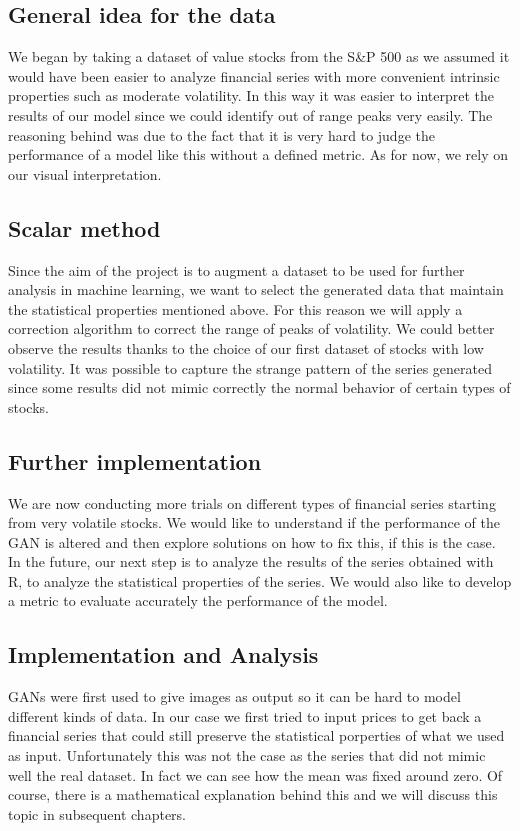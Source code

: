 \documentclass{article}
\begin{document}
\begin{multicols}{2}
    \subsection*{General idea for the data}
    We began by taking a dataset of value stocks from the S\&P 500 as we assumed it would have been easier to analyze financial series with more convenient intrinsic properties such as moderate volatility. In this way it was easier to interpret the results of our model since we could identify out of range peaks very easily. The reasoning behind was due to the fact that it is very hard to judge the performance of a model like this without a defined metric. As for now, we rely on our visual interpretation.\\ 
    
    \subsection*{Scalar method}
    Since the aim of the project is to augment a dataset to be used for further analysis in machine learning, we want to select the generated data that maintain the statistical properties mentioned above. For this reason we will apply a correction algorithm to correct the range of peaks of volatility. We could better observe the results thanks to the choice of our first dataset of stocks with low volatility. It was possible to capture the strange pattern of the series generated since some results did not mimic correctly  the normal behavior of certain types of stocks.\\ 
    
    \subsection*{Further implementation}
   We are now conducting more trials on different types of financial series starting from very volatile stocks. We would like to understand if the performance of the GAN is altered and then explore solutions on how to fix this, if this is the case.  In the future, our next step is to analyze the results of the series obtained with R, to analyze the statistical properties of the series. We would also like to develop a metric to evaluate accurately the performance of the model.\\

    \subsection*{Implementation and Analysis}
    GANs were first used to give images as output so it can be hard to model different kinds of data. In our case we first tried to input prices to get back a financial series that could still preserve the statistical porperties of what we used as input. Unfortunately this was not the case as the series that did not mimic well the real dataset. In fact we can see how the mean was fixed around zero. Of course, there is a mathematical explanation behind this and we will discuss this topic in subsequent chapters.\\
    

\end{multicols}
\end{document}
